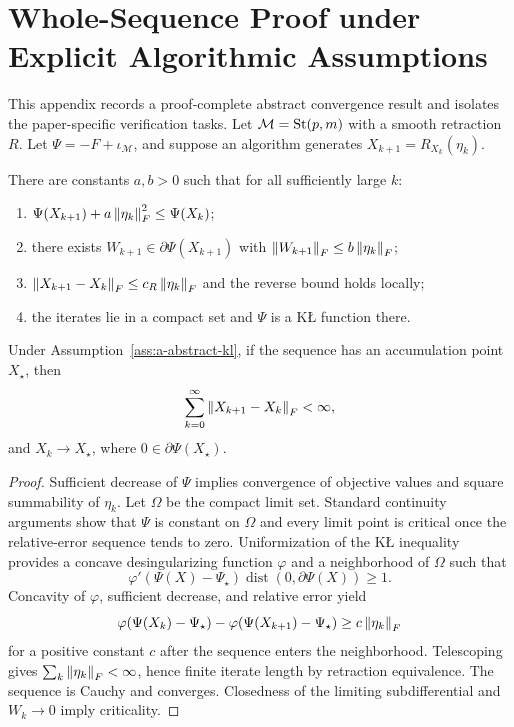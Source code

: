 \section{Whole-Sequence Proof under Explicit Algorithmic Assumptions}
\label{app:a-kl-proof}
This appendix records a proof-complete abstract convergence result and isolates the paper-specific verification tasks. Let $\mathcal M=\mathrm{St}(p,m)$ with a smooth retraction $R$. Let $\Psi=-F+\iota_{\mathcal M}$, and suppose an algorithm generates $X_{k+1}=R_{X_k}(\eta_k)$.

\begin{assumption}
\label{ass:a-abstract-kl}
There are constants $a,b>0$ such that for all sufficiently large $k$:
\begin{enumerate}[leftmargin=*]
\item $\Psi(X_{k+1})+a\left\lVert \eta_k \right\rVert_F^2\le\Psi(X_k)$;
\item there exists $W_{k+1}\in\partial\Psi(X_{k+1})$ with $\left\lVert W_{k+1} \right\rVert_F\le b\left\lVert \eta_k \right\rVert_F$;
\item $\left\lVert X_{k+1}-X_k \right\rVert_F\le c_R\left\lVert \eta_k \right\rVert_F$ and the reverse bound holds locally;
\item the iterates lie in a compact set and $\Psi$ is a KŁ function there.
\end{enumerate}
\end{assumption}

\begin{theorem}
\label{thm:a-abstract-kl}
Under Assumption~\ref{ass:a-abstract-kl}, if the sequence has an accumulation point $X_\star$, then
\[
\sum_{k=0}^{\infty}\left\lVert X_{k+1}-X_k \right\rVert_F<\infty,
\]
and $X_k\to X_\star$, where $0\in\partial\Psi(X_\star)$.
\end{theorem}
\begin{proof}
Sufficient decrease of $\Psi$ implies convergence of objective values and square summability of $\eta_k$. Let $\Omega$ be the compact limit set. Standard continuity arguments show that $\Psi$ is constant on $\Omega$ and every limit point is critical once the relative-error sequence tends to zero. Uniformization of the KŁ inequality provides a concave desingularizing function $\varphi$ and a neighborhood of $\Omega$ such that
\[
\varphi'(\Psi(X)-\Psi_\star)\operatorname{dist}(0,\partial\Psi(X))\ge1.
\]
Concavity of $\varphi$, sufficient decrease, and relative error yield
\[
\varphi(\Psi(X_k)-\Psi_\star)-\varphi(\Psi(X_{k+1})-\Psi_\star)
\ge c\left\lVert \eta_k \right\rVert_F
\]
for a positive constant $c$ after the sequence enters the neighborhood. Telescoping gives $\sum_k\left\lVert \eta_k \right\rVert_F<\infty$, hence finite iterate length by retraction equivalence. The sequence is Cauchy and converges. Closedness of the limiting subdifferential and $W_k\to0$ imply criticality.
\end{proof}

